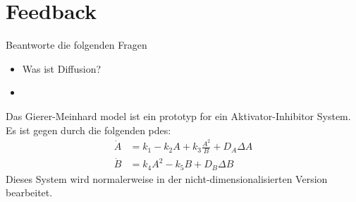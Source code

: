 \section{Feedback}
Beantworte die folgenden Fragen
\begin{itemize}
    \item Was ist Diffusion?
    \item
\end{itemize}
%
%
Das Gierer-Meinhard model ist ein prototyp for ein Aktivator-Inhibitor System.
Es ist gegen durch die folgenden \acp{pde}:
\begin{align}
    \dot{A} &= k_1 - k_2A + k_3\frac{A^2}{B} + D_A\Delta A\\
    \dot{B} &= k_4A^2 - k_5B + D_B\Delta B
\end{align}
Dieses System wird normalerweise in der nicht-dimensionalisierten Version bearbeitet.